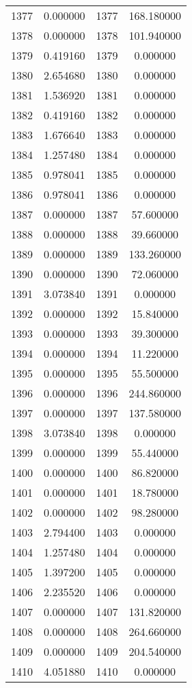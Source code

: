 \documentclass[12pt]{article}
\begin{document}
\begin{longtable}{@{}cccc@{}}
1377 & 0.000000 & 1377 & 168.180000 \\
1378 & 0.000000 & 1378 & 101.940000 \\
1379 & 0.419160 & 1379 & 0.000000 \\
1380 & 2.654680 & 1380 & 0.000000 \\
1381 & 1.536920 & 1381 & 0.000000 \\
1382 & 0.419160 & 1382 & 0.000000 \\
1383 & 1.676640 & 1383 & 0.000000 \\
1384 & 1.257480 & 1384 & 0.000000 \\
1385 & 0.978041 & 1385 & 0.000000 \\
1386 & 0.978041 & 1386 & 0.000000 \\
1387 & 0.000000 & 1387 & 57.600000 \\
1388 & 0.000000 & 1388 & 39.660000 \\
1389 & 0.000000 & 1389 & 133.260000 \\
1390 & 0.000000 & 1390 & 72.060000 \\
1391 & 3.073840 & 1391 & 0.000000 \\
1392 & 0.000000 & 1392 & 15.840000 \\
1393 & 0.000000 & 1393 & 39.300000 \\
1394 & 0.000000 & 1394 & 11.220000 \\
1395 & 0.000000 & 1395 & 55.500000 \\
1396 & 0.000000 & 1396 & 244.860000 \\
1397 & 0.000000 & 1397 & 137.580000 \\
1398 & 3.073840 & 1398 & 0.000000 \\
1399 & 0.000000 & 1399 & 55.440000 \\
1400 & 0.000000 & 1400 & 86.820000 \\
1401 & 0.000000 & 1401 & 18.780000 \\
1402 & 0.000000 & 1402 & 98.280000 \\
1403 & 2.794400 & 1403 & 0.000000 \\
1404 & 1.257480 & 1404 & 0.000000 \\
1405 & 1.397200 & 1405 & 0.000000 \\
1406 & 2.235520 & 1406 & 0.000000 \\
1407 & 0.000000 & 1407 & 131.820000 \\
1408 & 0.000000 & 1408 & 264.660000 \\
1409 & 0.000000 & 1409 & 204.540000 \\
1410 & 4.051880 & 1410 & 0.000000 \\

\end{longtable}
\end{document}
